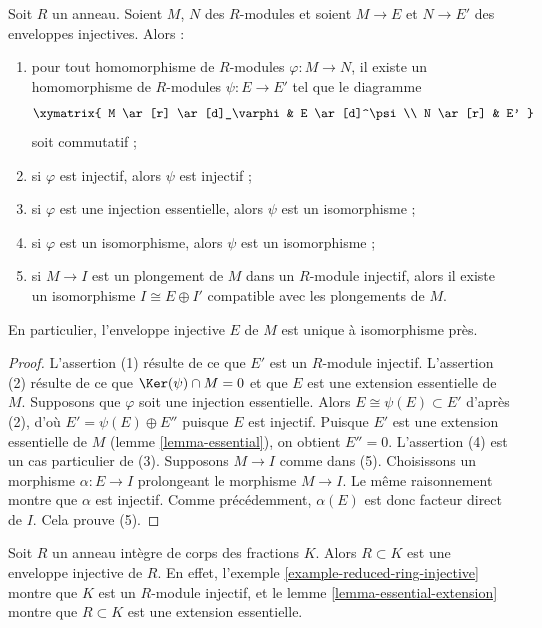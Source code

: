 \begin{lemma}
\label{lemma-injective-hull-unique}
Soit $R$ un anneau. Soient $M$, $N$ des $R$-modules et soient $M \to E$
et $N \to E'$ des enveloppes injectives. Alors :
\begin{enumerate}
\item pour tout homomorphisme de $R$-modules $\varphi : M \to N$, il existe un
homomorphisme de $R$-modules $\psi : E \to E'$ tel que le diagramme
$$
\xymatrix{
M \ar[r] \ar[d]_\varphi & E \ar[d]^\psi \\
N \ar[r] & E'
}
$$
soit commutatif ;
\item si $\varphi$ est injectif, alors $\psi$ est injectif ;
\item si $\varphi$ est une injection essentielle, alors $\psi$ est un isomorphisme ;
\item si $\varphi$ est un isomorphisme, alors $\psi$ est un isomorphisme ;
\item si $M \to I$ est un plongement de $M$ dans un $R$-module injectif,
alors il existe un isomorphisme $I \cong E \oplus I'$ compatible avec les plongements de $M$.
\end{enumerate}
En particulier, l'enveloppe injective $E$ de $M$ est unique à isomorphisme près.
\end{lemma}

\begin{proof}
L'assertion (1) résulte de ce que $E'$ est un $R$-module injectif.
L'assertion (2) résulte de ce que $\Ker(\psi) \cap M = 0$
et que $E$ est une extension essentielle de $M$.
Supposons que $\varphi$ soit une injection essentielle. Alors
$E \cong \psi(E) \subset E'$ d'après (2), d'où $E' = \psi(E) \oplus E''$ puisque $E$ est injectif.
Puisque $E'$ est une extension essentielle de $M$
(lemme \ref{lemma-essential}), on obtient $E'' = 0$.
L'assertion (4) est un cas particulier de (3).
Supposons $M \to I$ comme dans (5).
Choisissons un morphisme $\alpha : E \to I$ prolongeant le morphisme $M \to I$.
Le même raisonnement montre que $\alpha$ est injectif.
Comme précédemment, $\alpha(E)$ est donc facteur direct de $I$.
Cela prouve (5).
\end{proof}

\begin{example}
\label{example-injective-hull-domain}
Soit $R$ un anneau intègre de corps des fractions $K$.
Alors $R \subset K$ est une enveloppe injective de $R$.
En effet, l'exemple \ref{example-reduced-ring-injective} montre que $K$ est un $R$-module injectif,
et le lemme \ref{lemma-essential-extension} montre que $R \subset K$ est une extension essentielle.
\end{example}

